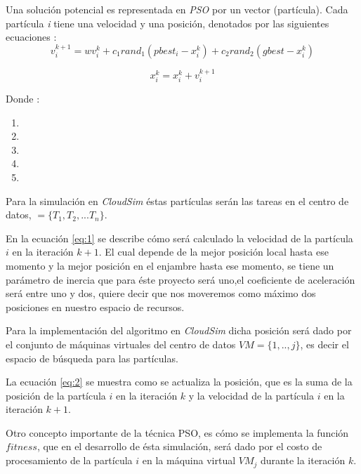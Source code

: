 Una solución potencial es representada en \textit{PSO} por un vector (partícula). Cada partícula \textit{i} tiene una velocidad y una posición, denotados por las siguientes ecuaciones \cite{pandey2010}: 
\begin{equation} \label{eq:1}
v_i^{k+1} = wv_i^k + c_1 rand_1  (pbest_i - x_i^k) + c_2 rand_2  (gbest - x_i^k) 
\end{equation}

\begin{equation} \label{eq:2}
x_i^k = x_i^k + v_i^{k+1}
\end{equation}


Donde : 
\begin{enumerate}
	\item {} 
	\item {} 
	
	\item {} 
	\item {} 
	\item {} 
\end{enumerate}
Para la simulación en \textit{CloudSim} éstas partículas serán las tareas en el centro de datos, $ = \{T_1 , T_2 , ... T_n\}  $.

En la ecuación \ref{eq:1} se describe cómo será calculado la velocidad de la partícula $i$ en la iteración $k+1$. El cual depende de la mejor posición local hasta ese momento y la mejor posición en el enjambre hasta ese momento, se tiene un parámetro de inercia que para éste proyecto será uno,el coeficiente de aceleración será entre uno y dos, quiere decir que nos moveremos como máximo dos posiciones en nuestro espacio de recursos.

Para la implementación del  algoritmo en \textit{CloudSim} dicha posición será dado por el conjunto de máquinas virtuales del centro de datos $VM = \{1,..,j\}$, es decir el espacio de búsqueda para las partículas.

La ecuación \ref{eq:2} se muestra como se actualiza la posición, que es la suma de la posición de la partícula $i$ en la iteración $k$ y la velocidad de la partícula $i$ en la iteración $k+1$.

Otro concepto importante de la técnica PSO, es cómo se implementa la función $fitness$, que en el desarrollo de ésta simulación, será dado por el costo de procesamiento de la partícula $i$ en la máquina virtual $VM_j$ durante la iteración $k$.

